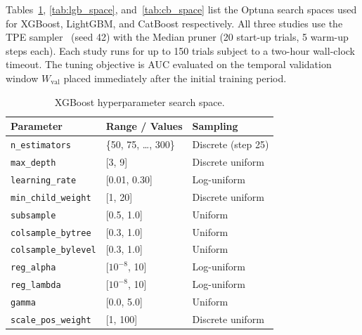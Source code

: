 \documentclass[pdflatex,sn-mathphys-num]{sn-jnl}
\theoremstyle{thmstyleone}
\theoremstyle{thmstyletwo}
\theoremstyle{thmstylethree}
\begin{document}
Tables~\ref{tab:xgb_space}, \ref{tab:lgb_space}, and~\ref{tab:cb_space}
list the Optuna search spaces used for XGBoost, LightGBM, and CatBoost
respectively. All three studies use the TPE sampler~\cite{bergstra2011tpe}
(seed 42) with the Median pruner (20 start-up trials, 5 warm-up steps each).
Each study runs for up to 150 trials subject to a two-hour wall-clock
timeout. The tuning objective is AUC evaluated on the temporal validation
window $W_{\mathrm{val}}$ placed immediately after the initial training
period.

\begin{table}[t]
  \caption{XGBoost hyperparameter search space.}
  \label{tab:xgb_space}
  \centering
  \begin{tabular}{lll}
    \toprule
    Parameter & Range / Values & Sampling \\
    \midrule
    \texttt{n\_estimators}       & \{50, 75, \ldots, 300\}  & Discrete (step 25) \\
    \texttt{max\_depth}          & {[}3, 9{]}               & Discrete uniform \\
    \texttt{learning\_rate}      & {[}0.01, 0.30{]}         & Log-uniform \\
    \texttt{min\_child\_weight}  & {[}1, 20{]}              & Discrete uniform \\
    \texttt{subsample}           & {[}0.5, 1.0{]}           & Uniform \\
    \texttt{colsample\_bytree}   & {[}0.3, 1.0{]}           & Uniform \\
    \texttt{colsample\_bylevel}  & {[}0.3, 1.0{]}           & Uniform \\
    \texttt{reg\_alpha}          & {[}$10^{-8}$, 10{]}      & Log-uniform \\
    \texttt{reg\_lambda}         & {[}$10^{-8}$, 10{]}      & Log-uniform \\
    \texttt{gamma}               & {[}0.0, 5.0{]}           & Uniform \\
    \texttt{scale\_pos\_weight}  & {[}1, 100{]}             & Discrete uniform \\
    \bottomrule
  \end{tabular}
\end{table}
\end{document}
